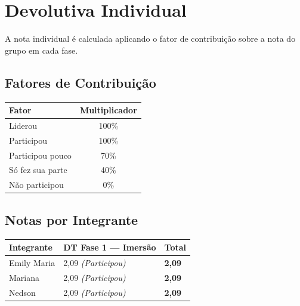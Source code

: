 \documentclass[
  sigconf,
  nonacm, %
  language=portuguese
]{acmart}
\begin{document}
\section{Devolutiva Individual}

A nota individual é calculada aplicando o fator de contribuição sobre a nota do grupo em cada fase.

\subsection{Fatores de Contribuição}

\begin{tabularx}{0.6\linewidth}{@{} X c @{}}
\toprule
\textbf{Fator} & \textbf{Multiplicador} \\
\midrule
Liderou & 100\% \\
Participou & 100\% \\
Participou pouco & 70\% \\
Só fez sua parte & 40\% \\
Não participou & 0\% \\
\bottomrule
\end{tabularx}

\vspace{1em}
\subsection{Notas por Integrante}

\begin{tabularx}{\linewidth}{@{} X X p{2.5cm} @{}}
\toprule
\textbf{Integrante} & \textbf{\small DT Fase 1 — Imersão} & \textbf{Total} \\
\midrule
Emily Maria & 2,09 \textit{(Participou)} & \textbf{2,09} \\
Mariana & 2,09 \textit{(Participou)} & \textbf{2,09} \\
Nedson & 2,09 \textit{(Participou)} & \textbf{2,09} \\
\bottomrule
\end{tabularx}
\end{document}
